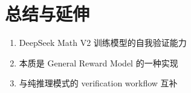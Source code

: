 \section{总结与延伸}
\begin{enumerate}
  \item DeepSeek Math V2 训练模型的自我验证能力
  \item 本质是 General Reward Model 的一种实现
  \item 与纯推理模式的 verification workflow 互补
\end{enumerate}

